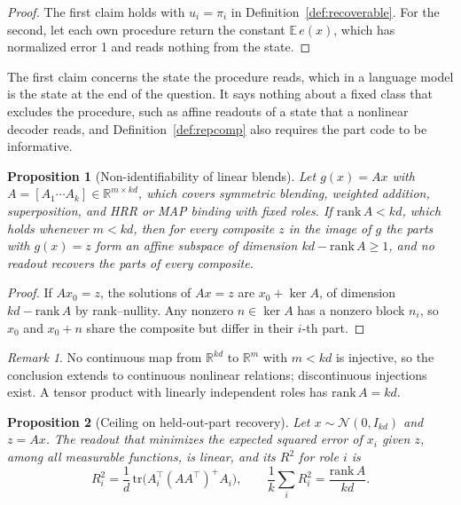 \documentclass[10pt]{article}
\theoremstyle{plain}
\newtheorem{proposition}{Proposition}
\theoremstyle{remark}
\newtheorem*{remark}{Remark}
\newcommand{\R}{\mathbb{R}}
\begin{document}
\begin{proof}
The first claim holds with $u_i = \pi_i$ in Definition~\ref{def:recoverable}. For the second, let each own procedure return the constant $\mathbb{E}\,e(x)$, which has normalized error 1 and reads nothing from the state.
\end{proof}

\noindent
The first claim concerns the state the procedure reads, which in a language model is the state at the end of the question. It says nothing about a fixed class that excludes the procedure, such as affine readouts of a state that a nonlinear decoder reads, and Definition~\ref{def:repcomp} also requires the part code to be informative.

\begin{proposition}[Non-identifiability of linear blends]
\label{prop:fiber}
Let $g(x) = Ax$ with $A = [A_1 \cdots A_k] \in \R^{m \times kd}$, which covers symmetric blending, weighted addition, superposition, and HRR or MAP binding with fixed roles. If $\mathrm{rank}\,A < kd$, which holds whenever $m < kd$, then for every composite $z$ in the image of $g$ the parts with $g(x) = z$ form an affine subspace of dimension $kd - \mathrm{rank}\,A \geq 1$, and no readout recovers the parts of every composite.
\end{proposition}

\begin{proof}
If $Ax_0 = z$, the solutions of $Ax = z$ are $x_0 + \ker A$, of dimension $kd - \mathrm{rank}\,A$ by rank--nullity. Any nonzero $n \in \ker A$ has a nonzero block $n_i$, so $x_0$ and $x_0 + n$ share the composite but differ in their $i$-th part.
\end{proof}

\begin{remark}
No continuous map from $\R^{kd}$ to $\R^m$ with $m < kd$ is injective, so the conclusion extends to continuous nonlinear relations; discontinuous injections exist. A tensor product with linearly independent roles has $\mathrm{rank}\,A = kd$.
\end{remark}

\begin{proposition}[Ceiling on held-out-part recovery]
\label{prop:ceiling}
Let $x \sim \mathcal{N}(0, I_{kd})$ and $z = Ax$. The readout that minimizes the expected squared error of $x_i$ given $z$, among all measurable functions, is linear, and its $R^2$ for role $i$ is
\begin{equation}
  R^2_i = \frac{1}{d}\,\mathrm{tr}\big(A_i^{\top} (A A^{\top})^{+} A_i\big), \qquad \frac{1}{k}\sum_i R^2_i = \frac{\mathrm{rank}\,A}{kd}.
\end{equation}
\end{proposition}
\end{document}
